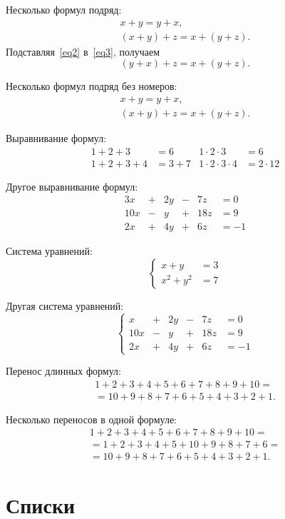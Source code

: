 \documentclass{stud-conf-pmk}
\begin{document}
\begin{paper}
Несколько формул подряд:
\begin{gather}
x+y=y+x,\label{eq2}\\
(x+y)+z=x+(y+z).\label{eq3}
\end{gather}
Подставляя~\eqref{eq2} в~\eqref{eq3}, получаем
$$(y+x)+z=x+(y+z).$$

Несколько формул подряд без номеров:
\begin{gather*}
x+y=y+x,\\
(x+y)+z=x+(y+z).
\end{gather*}

Выравнивание формул:
\begin{align*}
1+2+3&=6&1 \cdot 2 \cdot 3&=6\\
1+2+3+4&=3+7&1 \cdot 2 \cdot 3 \cdot 4&=2 \cdot 12
\end{align*}

Другое выравнивание формул:
\begin{alignat*}{3}
x&{}+{}&2y&{}-{}&7z&=0\\
10x&{}-{}&y&{}+{}&18z&=9\\
2x&{}+{}&4y&{}+{}&6z&=-1
\end{alignat*}

Система уравнений:
$$\left\{
\begin{aligned}
x+y&=3\\
x^2+y^2&=7
\end{aligned}
\right.$$

Другая система уравнений:
$$\left\{\begin{alignedat}{3}
x&{}+{}&2y&{}-{}&7z&=0\\
10x&{}-{}&y&{}+{}&18z&=9\\
2x&{}+{}&4y&{}+{}&6z&=-1
\end{alignedat}\right.$$

Перенос длинных формул:
\begin{multline*}
1+2+3+4+5+6+7+8+9+10=\\
=10+9+8+7+6+5+4+3+2+1.
\end{multline*}

Несколько переносов в одной формуле:
\begin{multline*}
1+2+3+4+5+6+7+8+9+10=\\
=1+2+3+4+5+10+9+8+7+6=\\
=10+9+8+7+6+5+4+3+2+1.
\end{multline*}

\section{Списки}


\end{paper}
\end{document}
